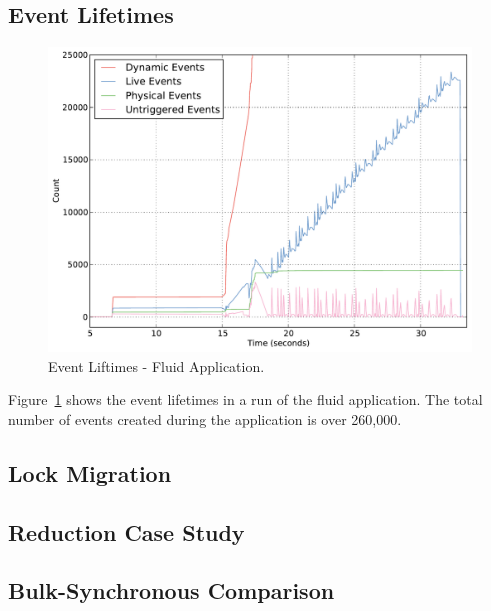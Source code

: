 \subsection{Event Lifetimes}
\label{subsec:eventlife}

\begin{figure}
\begin{center}
\includegraphics[scale=0.33]{figs/event_lifetimes.pdf}
\end{center}
\vspace{-6mm}
\caption{Event Liftimes - Fluid Application.\label{fig:eventlife}}
\vspace{-4mm}
\end{figure}

Figure~\ref{fig:eventlife} shows the event lifetimes in a run of the fluid application.  The total number
of events created during the application is over 260,000.

\subsection{Lock Migration}
\label{subsec:lockmig}

\subsection{Reduction Case Study}
\label{subsec:reduccase}

\subsection{Bulk-Synchronous Comparison}
\label{subsec:bulkcomp}

